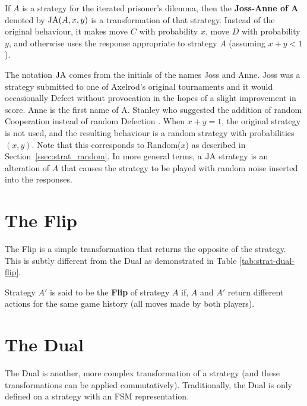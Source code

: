 \begin{definition}\label{def:joss-ann}
If $A$ is a strategy for the iterated prisoner's dilemma, then the \textbf{Joss-Anne of A} denoted by $\text{JA}(A, x, y)$ is a transformation of that strategy.
Instead of the original behaviour, it makes move $C$ with probability $x$, move $D$ with probability $y$, and otherwise uses the response appropriate to strategy $A$ (assuming $x+y < 1$).
\end{definition}

The notation $\text{JA}$ comes from the initials of the names Joss and Anne.
Joss was a strategy submitted to one of Axelrod’s original tournaments and it would occasionally Defect without provocation in the hopes of a slight improvement in score.
Anne is the first name of A. Stanley who suggested the addition of random Cooperation instead of random Defection \cite{Ashlock2008}.
When $x + y = 1$, the original strategy is not used, and the resulting behaviour
is a random strategy with probabilities $(x, y)$. Note that this corresponds to
Random($x$) as described in Section~\ref{ssec:strat_random}.
In more general terms, a $\text{JA}$ strategy is an alteration of $A$ that causes the strategy to be played with random noise inserted into the responses.



\section{The Flip}\label{sec:flip}
The Flip is a simple transformation that returns the opposite of the strategy.
This is subtly different from the Dual as demonstrated in Table \ref{tab:strat-dual-flip}.

\begin{definition}\label{def:flip}
Strategy $A'$ is said to be the \textbf{Flip} of strategy $A$ if, $A$ and $A'$ return different actions for the same game history (all moves made by both players).
\end{definition}



\section{The Dual}\label{sec:dual}
The Dual is another, more complex transformation of a strategy \cite{Ashlock2008, Ashlock2010, Ashlock2004,  Ashlock2005, Ashlock2009, Ashlock2006} (and these transformations can be applied commutatively).
Traditionally, the Dual is only defined on a strategy with an FSM representation.

